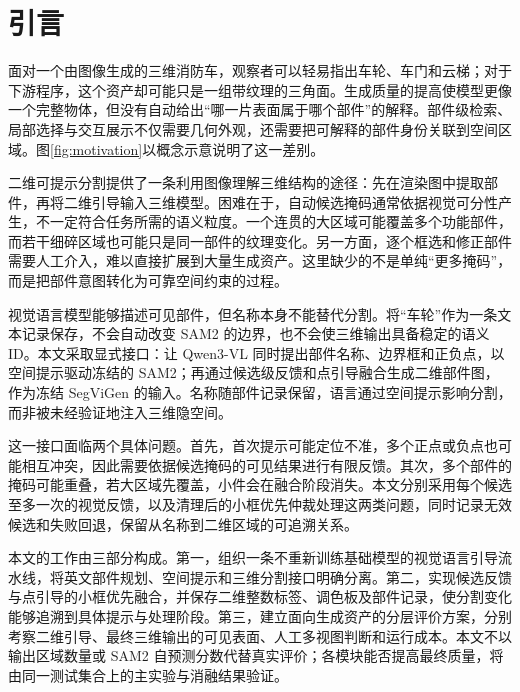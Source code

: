 \section{引言}
\label{sec:introduction}
面对一个由图像生成的三维消防车，观察者可以轻易指出车轮、车门和云梯；对于下游程序，这个资产却可能只是一组带纹理的三角面。生成质量的提高使模型更像一个完整物体，但没有自动给出“哪一片表面属于哪个部件”的解释。部件级检索、局部选择与交互展示不仅需要几何外观，还需要把可解释的部件身份关联到空间区域。图\ref{fig:motivation}以概念示意说明了这一差别。

二维可提示分割提供了一条利用图像理解三维结构的途径：先在渲染图中提取部件，再将二维引导输入三维模型。困难在于，自动候选掩码通常依据视觉可分性产生，不一定符合任务所需的语义粒度。一个连贯的大区域可能覆盖多个功能部件，而若干细碎区域也可能只是同一部件的纹理变化。另一方面，逐个框选和修正部件需要人工介入，难以直接扩展到大量生成资产。这里缺少的不是单纯“更多掩码”，而是把部件意图转化为可靠空间约束的过程。

视觉语言模型能够描述可见部件，但名称本身不能替代分割。将“车轮”作为一条文本记录保存，不会自动改变 SAM2 的边界，也不会使三维输出具备稳定的语义 ID。本文采取显式接口：让 Qwen3-VL 同时提出部件名称、边界框和正负点，以空间提示驱动冻结的 SAM2；再通过候选级反馈和点引导融合生成二维部件图，作为冻结 SegViGen 的输入。名称随部件记录保留，语言通过空间提示影响分割，而非被未经验证地注入三维隐空间。

这一接口面临两个具体问题。首先，首次提示可能定位不准，多个正点或负点也可能相互冲突，因此需要依据候选掩码的可见结果进行有限反馈。其次，多个部件的掩码可能重叠，若大区域先覆盖，小件会在融合阶段消失。本文分别采用每个候选至多一次的视觉反馈，以及清理后的小框优先仲裁处理这两类问题，同时记录无效候选和失败回退，保留从名称到二维区域的可追溯关系。

本文的工作由三部分构成。第一，组织一条不重新训练基础模型的视觉语言引导流水线，将英文部件规划、空间提示和三维分割接口明确分离。第二，实现候选反馈与点引导的小框优先融合，并保存二维整数标签、调色板及部件记录，使分割变化能够追溯到具体提示与处理阶段。第三，建立面向生成资产的分层评价方案，分别考察二维引导、最终三维输出的可见表面、人工多视图判断和运行成本。本文不以输出区域数量或 SAM2 自预测分数代替真实评价；各模块能否提高最终质量，将由同一测试集合上的主实验与消融结果验证。


